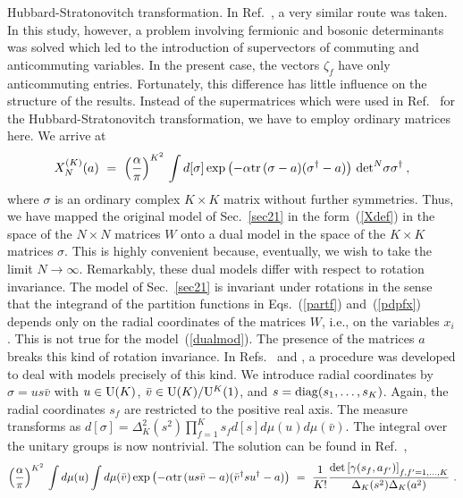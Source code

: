 Hubbard-Stratonovitch transformation. In Ref.~\cite{Guhr97a}, a
very similar route was taken. In this study, however, a problem
involving fermionic and bosonic determinants was solved which led to
the introduction of supervectors of commuting and anticommuting
variables. In the present case, the vectors $\zeta_f$ have only
anticommuting entries. Fortunately, this difference has little
influence on the structure of the results. Instead of the
supermatrices which were used in Ref.~\cite{Guhr97a} for the
Hubbard-Stratonovitch transformation, we have to employ ordinary
matrices here. We arrive at
\begin{equation}
X_N^{(K)}(a) \ = \ \left(\frac{\alpha}{\pi}\right)^{K^2}
                   \, \int d[\sigma]
  \exp\left(-\alpha{{\rm tr}\,}(\sigma-a)(\sigma^\dagger-a)\right)
                   \, {\rm det}^N\sigma\sigma^\dagger \:,
\label{dualmod}
\end{equation}
where $\sigma$ is an ordinary complex $K\times K$ matrix without
further symmetries. Thus, we have mapped the original model of
Sec.~\ref{sec21} in the form~(\ref{Xdef}) in the space of the $N\times
N$ matrices $W$ onto a dual model in the space of the $K\times K$
matrices $\sigma$. This is highly convenient because, eventually, we
wish to take the limit $N\to\infty$.  Remarkably, these dual models
differ with respect to rotation invariance. The model of
Sec.~\ref{sec21} is invariant under rotations in the sense that the
integrand of the partition functions in Eqs.~(\ref{partf})
and~(\ref{pdpfx}) depends only on the radial coordinates of the
matrices $W$, i.e., on the variables $x_i$.  This is not true for the
model~(\ref{dualmod}). The presence of the matrices $a$ breaks this
kind of rotation invariance. In Refs.~\cite{Guhr96b} and
\cite{Guhr97a}, a procedure was developed to deal with models
precisely of this kind. We introduce radial coordinates by
$\sigma=us\bar{v}$ with $u\in {\rm U}(K)$, $\bar{v}\in {\rm U}(K)/
{\rm U}^K(1)$, and $s={\rm diag}(s_1,\ldots,s_K)$. Again, the radial
coordinates $s_f$ are restricted to the positive real axis. The
measure transforms as
$d[\sigma]=\Delta_K^2(s^2)\prod_{f=1}^Ks_fd[s]d\mu(u)d\mu(\bar{v})$.
The integral over the unitary groups is now nontrivial. The solution
can be found in Ref.~\cite{Guhr96b},
\begin{equation}
\left(\frac{\alpha}{\pi}\right)^{K^2} \, 
          \int d\mu(u) \int d\mu(\bar{v}) 
          \exp\left(-\alpha{{\rm tr}\,}(us\bar{v}-a)
                   (\bar{v}^\dagger su^\dagger-a)\right) \ = \
           \frac{1}{K!}
           \frac{\det\left[\gamma(s_f,a_{f^\prime})
                      \right]_{f,f^\prime=1,\ldots,K}}
                {\Delta_K(s^2)\Delta_K(a^2)} \ .
\label{groupint}
\end{equation}
